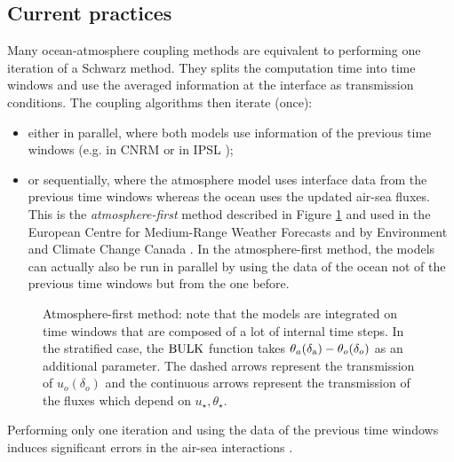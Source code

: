 \subsection{Current practices}
Many ocean-atmosphere coupling methods are equivalent to
performing one iteration of a Schwarz method.
They splits the computation time into time windows and
use the averaged information at the interface as transmission
conditions.
The coupling algorithms then iterate (once):
\begin{itemize}
	\item either in parallel, where both models use information
		of the previous time windows
		(e.g. in CNRM \citep{voldoire_cnrm-cm51_2013}
		or in IPSL \citep{marti_key_2010});
	\item or sequentially, where the atmosphere model
		uses interface data from the previous time windows
		whereas the ocean uses the updated air-sea fluxes.
		This is the \textit{atmosphere-first} method
		described in Figure \ref{fig:airseaSCM_atmFirst} and
		used in the European Centre for Medium-Range Weather
		Forecasts \citep{mogensen_coupling_2012} and by
		Environment and Climate Change Canada
		\citep{marti_schwarz_2021}.
		In the atmosphere-first method,
		the models can actually also be
		run in parallel by using the data of the ocean
		not of the previous time windows but from the
		one before.
\end{itemize}
\begin{figure}
\centering
\caption{Atmosphere-first method: note that the models are
	integrated on time windows that are composed of a lot
	of internal time steps. In the stratified case, the
	${\rm BULK}$ function takes $\theta_a(\delta_{\rm a}) -
	\theta_o(\delta_o)$ as an additional parameter.
	The dashed arrows represent the transmission of
	$u_o(\delta_o)$ and the continuous arrows represent the
	transmission of the fluxes which depend on
	$u_\star, \theta_\star$.
	}
\label{fig:airseaSCM_atmFirst}
\end{figure}
Performing only one iteration and using the data of the previous
time windows induces significant errors in the air-sea
interactions \citep{marti_schwarz_2021}.
